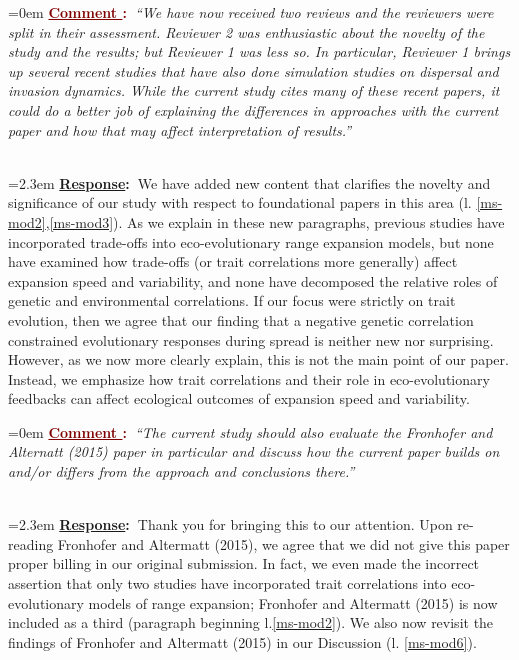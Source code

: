 \documentclass[12pt]{article}
\newcounter{cN}
\newcommand{\comment}[1]{
	\vspace{2em}
	\refstepcounter{cN} %
	\noindent \hangindent=0em \textbf{\textcolor{Maroon}{\uline{Comment \thecN}:~}}\emph{``#1''}
	}
\newcommand{\response}[1]{
	\\[0.25em]
	\hangindent=2.3em \textbf{\textcolor{NavyBlue}{\uline{Response}:~}}#1
	}
\begin{document}
\comment{We have now received two reviews and the reviewers were split in their assessment. Reviewer 2 was enthusiastic about the novelty of the study and the results; but Reviewer 1 was less so.
In particular, Reviewer 1 brings up several recent studies that have also done simulation studies on dispersal and invasion dynamics.
While the current study cites many of these recent papers, it could do a better job of explaining the differences in approaches with the current paper and how that may affect interpretation of results.}
\response{We have added new content that clarifies the novelty and significance of our study with respect to foundational papers in this area (l. \ref{ms-mod2},\ref{ms-mod3}).
As we explain in these new paragraphs, previous studies have incorporated trade-offs into eco-evolutionary range expansion models, but none have examined how trade-offs (or trait correlations more generally) affect expansion speed and variability, and none have decomposed the relative roles of genetic and environmental correlations.
If our focus were strictly on trait evolution, then we agree that our finding that a negative genetic correlation constrained evolutionary responses during spread is neither new nor surprising.
However, as we now more clearly explain, this is not the main point of our paper.
Instead, we emphasize how trait correlations and their role in eco-evolutionary feedbacks can affect ecological outcomes of expansion speed and variability.}

\comment{The current study should also evaluate the Fronhofer and Alternatt (2015) paper in particular and discuss how the current paper builds on and/or differs from the approach and conclusions there.}
\response{Thank you for bringing this to our attention. Upon re-reading Fronhofer and Altermatt (2015), we agree that we did not give this paper proper billing in our original submission.
In fact, we even made the incorrect assertion that only two studies have incorporated trait correlations into eco-evolutionary models of range expansion; Fronhofer and Altermatt (2015) is now included as a third (paragraph beginning l.\ref{ms-mod2}).
We also now revisit the findings of Fronhofer and Altermatt (2015) in our Discussion (l. \ref{ms-mod6}).
}
\end{document}
